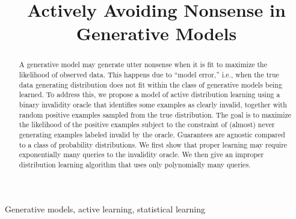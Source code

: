\documentclass[final,12pt]{colt2018} %
\title[Actively Avoiding Nonsense in Generative Models]{Actively Avoiding Nonsense in Generative Models}
\begin{document}
\maketitle

\begin{abstract}
A generative model may generate utter nonsense when it is fit to maximize the likelihood of observed data. This happens due to ``model error,'' i.e., when the true data generating distribution does not fit within the class of generative models being learned. To address this, we propose a model of active distribution learning using a binary invalidity oracle that identifies some examples as clearly invalid, together with random positive examples sampled from the true distribution. The goal is to maximize the likelihood of the positive examples subject to the constraint of (almost) never generating examples labeled invalid by the oracle. Guarantees are agnostic compared to a class of probability distributions. We first show that proper learning may require exponentially many queries to the invalidity oracle. We then give an improper distribution learning algorithm that uses only polynomially many queries. 
\end{abstract}

\begin{keywords}
Generative models, active learning, statistical learning
\end{keywords}









\appendix



\end{document}

